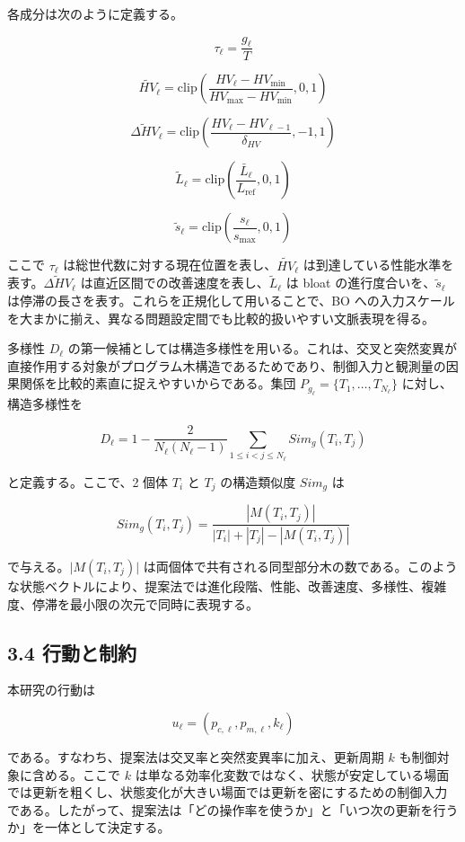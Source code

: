 各成分は次のように定義する。

\[
\tau_\ell = \frac{g_\ell}{T}
\]

\[
\widetilde{HV}_\ell =
\mathrm{clip}
\left(
\frac{HV_\ell - HV_{\min}}{HV_{\max} - HV_{\min}},
0, 1
\right)
\]

\[
\widetilde{\Delta HV}_\ell =
\mathrm{clip}
\left(
\frac{HV_\ell - HV_{\ell-1}}{\delta_{HV}},
-1, 1
\right)
\]

\[
\widetilde{L}_\ell =
\mathrm{clip}
\left(
\frac{\bar{L}_\ell}{L_{\mathrm{ref}}},
0, 1
\right)
\]

\[
\widetilde{s}_\ell =
\mathrm{clip}
\left(
\frac{s_\ell}{s_{\max}},
0, 1
\right)
\]

ここで $\tau_\ell$ は総世代数に対する現在位置を表し、$\widetilde{HV}_\ell$ は到達している性能水準を表す。$\widetilde{\Delta HV}_\ell$ は直近区間での改善速度を表し、$\widetilde{L}_\ell$ は bloat の進行度合いを、$\widetilde{s}_\ell$ は停滞の長さを表す。これらを正規化して用いることで、BO への入力スケールを大まかに揃え、異なる問題設定間でも比較的扱いやすい文脈表現を得る。

多様性 $D_\ell$ の第一候補としては構造多様性を用いる。これは、交叉と突然変異が直接作用する対象がプログラム木構造であるためであり、制御入力と観測量の因果関係を比較的素直に捉えやすいからである。集団 $P_{g_\ell} = \{T_1,\dots,T_{N_\ell}\}$ に対し、構造多様性を

\[
D_\ell
=
1
-
\frac{2}{N_\ell(N_\ell-1)}
\sum_{1 \le i < j \le N_\ell}
Sim_g(T_i,T_j)
\]

と定義する。ここで、2 個体 $T_i$ と $T_j$ の構造類似度 $Sim_g$ は

\[
Sim_g(T_i,T_j)
=
\frac{|M(T_i,T_j)|}{|T_i| + |T_j| - |M(T_i,T_j)|}
\]

で与える。$\lvert M(T_i,T_j)\rvert$ は両個体で共有される同型部分木の数である。このような状態ベクトルにより、提案法では進化段階、性能、改善速度、多様性、複雑度、停滞を最小限の次元で同時に表現する。

\subsection{3.4 行動と制約}


本研究の行動は

\[
u_\ell = (p_{c,\ell}, p_{m,\ell}, k_\ell)
\]

である。すなわち、提案法は交叉率と突然変異率に加え、更新周期 $k$ も制御対象に含める。ここで $k$ は単なる効率化変数ではなく、状態が安定している場面では更新を粗くし、状態変化が大きい場面では更新を密にするための制御入力である。したがって、提案法は「どの操作率を使うか」と「いつ次の更新を行うか」を一体として決定する。

